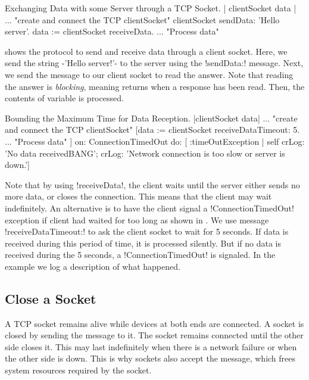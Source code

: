 \documentclass[a4paper,10pt,twoside]{book}
\begin{document}
\begin{script}[dataExhangeWithTcpSocket]{Exchanging Data with some Server through a TCP Socket.}
| clientSocket data |
... "create and connect the TCP clientSocket"
clientSocket sendData: 'Hello server'.
data := clientSocket receiveData.
... "Process data"
\end{script}

 shows the protocol to send and receive data through a client socket.
Here, we send the string \ct-'Hello server!'- to the server using the \ct!sendData:! message.
Next, we send the  message to our client socket to read the answer. Note that reading the answer is \emph{blocking}, meaning  returns when a response has been read. Then, the contents of variable  is processed.

\begin{script}[dataReceptionTimeOut]{Bounding the Maximum Time for Data Reception.}
|clientSocket data|
... "create and connect the TCP clientSocket"
[data := clientSocket receiveDataTimeout: 5.
... "Process data"
   ] on: ConnectionTimedOut 
   do: [ :timeOutException |
	 	self 
			crLog: 'No data receivedBANG';
			crLog: 'Network connection is too slow or server is down.']
\end{script}

Note that by using  \ct!receiveData!, the client waits until the server either sends no more data, or closes the connection.
This means that the client may wait indefinitely.
An alternative is to have the client signal a \ct!ConnectionTimedOut! exception if client had waited for too long as shown in .
We use message \ct!receiveDataTimeout:! to ask the client socket to wait for 5 seconds.
If data is received during this period of time, it is processed silently.
But if no data is received during the 5 seconds, a \ct!ConnectionTimedOut! is signaled.
In the example we log a description of what happened.

\subsection{Close a Socket}
A TCP socket remains alive while devices at both ends are connected.
A socket is closed by sending the message  to it.
The socket remains connected until the other side closes it.
This may last indefinitely when there is a network failure or when the other side is down.
This is why sockets also accept the  message, which frees system resources 
required by the socket.
\end{document}

